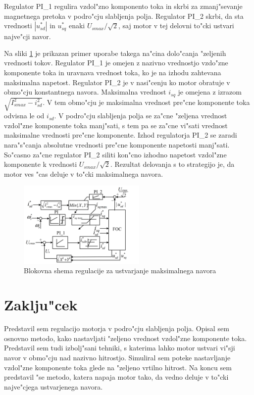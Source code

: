 \documentclass[journal,a4paper,twoside]{sty/IEEEtran}
\begin{document}
Regulator PI\_1 regulira vzdol"zno komponento toka in skrbi za zmanj"sevanje magnetnega pretoka v podro"cju slabljenja polja. Regulator PI\_2 skrbi, da sta vrednosti $|u_{sd}^*|$ in $u_{sq}^*$ enaki $U_{smax}/\sqrt{2}$, saj motor v tej delovni to"cki ustvari najve"cji navor.

Na sliki \ref{fig:MTPA_app} je prikazan primer uporabe takega na"cina dolo"canja "zeljenih vrednosti tokov. Regulator PI\_1 je omejen z nazivno vrednostjo vzdo"zne komponente toka in uravnava vrednost toka, ko je na izhodu zahtevana maksimalna napetost. Regulator PI\_2 je v nasi"cenju ko motor obratuje v obmo"cju konstantnega navora. Maksimalna vrednost $i_{sq}$ je omejena z izrazom $\sqrt{I_{smax}^2-i_{sd}^2}$. V tem obmo"cju je maksimalna vrednost pre"cne komponente toka odvisna le od $i_{sd}$. V podro"cju slabljenja polja se za"cne "zeljena vrednost vzdol"zne komponente toka manj"sati, s tem pa se za"cne vi"sati vrednost maksimalne vrednosti pre"cne komponente. Izhod regulatorja PI\_2 se zaradi nara"s"canja absolutne vrednosti pre"cne komponente napetosti manj"sati. So"casno za"cne regulator PI\_2 siliti kon"cno izhodno napetost vzdol"zne komponente k vrednosti $U_{smax}/\sqrt{2}$. Rezultat delovanja s to strategijo je, da motor ves "cas deluje v to"cki maksimalnega navora.~\cite{MTPA}



\begin{figure}
\includegraphics[width=0.55\textwidth]{MTPA.png}

\caption{Blokovna shema regulacije za ustvarjanje maksimalnega navora\cite{MTPA}}
\label{fig:MTPA_app}
\end{figure}

\section{Zaklju"cek}

Predstavil sem regulacijo motorja v podro"cju slabljenja polja. Opisal sem osnovno metodo, kako nastavljati "zeljeno vrednost vzdol"zne komponente toka. Predstavil sem tudi izbolj"sani tehniki, s katerima lahko motor ustvari vi"sji navor v obmo"cju nad nazivno hitrostjo. Simuliral sem poteke nastavljanje vzdol"zne komponente toka glede na "zeljeno vrtilno hitrost. Na koncu sem predstavil "se metodo, katera napaja motor tako, da vedno deluje v to"cki najve"cjega ustvarjenega navora.
\end{document}
